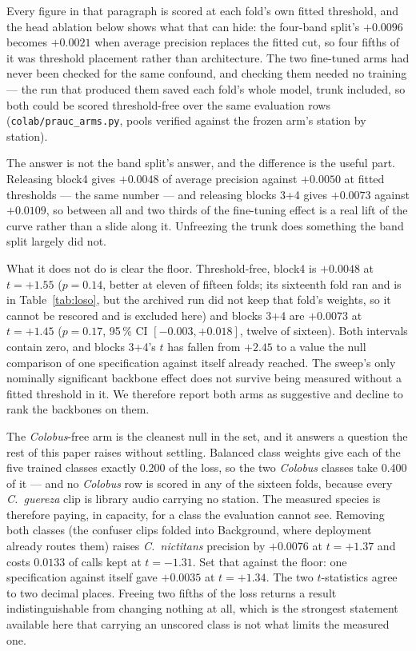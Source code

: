 \documentclass[review,3p,times]{elsarticle}
\begin{document}
Every figure in that paragraph is scored at each fold's own fitted threshold,
and the head ablation below shows what that can hide: the four-band split's
$+0.0096$ becomes $+0.0021$ when average precision replaces the fitted cut, so
four fifths of it was threshold placement rather than architecture. The two
fine-tuned arms had never been checked for the same confound, and checking them
needed no training --- the run that produced them saved each fold's whole model,
trunk included, so both could be scored threshold-free over the same evaluation
rows (\texttt{colab/prauc\_arms.py}, pools verified against the frozen arm's
station by station).

The answer is not the band split's answer, and the difference is the useful
part. Releasing block4 gives $+0.0048$ of average precision against
$+0.0050$ at fitted thresholds --- the same number --- and releasing blocks 3+4
gives $+0.0073$ against $+0.0109$, so between all and two thirds of the
fine-tuning effect is a real lift of the curve rather than a slide along it.
Unfreezing the trunk does something the band split largely did not.

What it does not do is clear the floor. Threshold-free, block4 is $+0.0048$ at
$t = +1.55$ ($p = 0.14$, better at eleven of fifteen folds; its sixteenth fold
ran and is in Table~\ref{tab:loso}, but the archived run did not keep that
fold's weights, so it cannot be rescored and is excluded here) and blocks 3+4
are
$+0.0073$ at $t = +1.45$ ($p = 0.17$, 95\,\% CI $[-0.003, +0.018]$, twelve of
sixteen). Both intervals contain zero, and blocks 3+4's $t$ has fallen from
$+2.45$ to a value the null comparison of one specification against itself
already reached. The sweep's only nominally significant backbone effect does not
survive being measured without a fitted threshold in it. We therefore report
both arms as suggestive and decline to rank the backbones on them.

The \textit{Colobus}-free arm is the cleanest null in the set, and it answers a
question the rest of this paper raises without settling. Balanced class weights
give each of the five trained classes exactly 0.200 of the loss, so the two
\textit{Colobus} classes take 0.400 of it --- and no \textit{Colobus} row is
scored in any of the sixteen folds, because every \textit{C.\ guereza} clip is
library audio carrying no station. The measured species is therefore paying, in
capacity, for a class the evaluation cannot see. Removing both classes (the
confuser clips folded into Background, where deployment already routes them)
raises \textit{C.\ nictitans} precision by $+0.0076$ at $t = +1.37$ and costs
$0.0133$ of calls kept at $t = -1.31$. Set that against the floor: one
specification against itself gave $+0.0035$ at $t = +1.34$. The two
$t$-statistics agree to two decimal places. Freeing two fifths of the
loss returns a result indistinguishable from changing nothing at all, which is
the strongest statement available here that carrying an unscored class is not
what limits the measured one.
\end{document}
